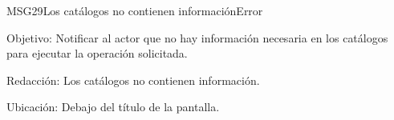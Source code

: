 \begin{mensaje}{MSG29}{Los catálogos no contienen información}{Error}
	\item [Objetivo:] Notificar al actor que no hay información necesaria en los catálogos para ejecutar la operación solicitada.
	\item[Redacción:] Los catálogos no contienen información.
	\item [Ubicación:] Debajo del título de la pantalla.
\end{mensaje}